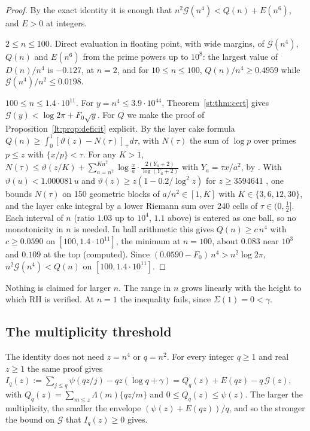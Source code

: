 \begin{proof}
By the exact identity it is enough that $n^2\mathcal G(n^4)<Q(n)+E(n^6)$, and $E>0$ at integers.

\emph{$2\le n\le100$.} Direct evaluation in floating point, with wide margins, of $\mathcal G(n^4)$, $Q(n)$ and $E(n^6)$ from the prime powers up to $10^8$: the largest value of $D(n)/n^4$ is $-0.127$, at $n=2$, and for $10\le n\le100$, $Q(n)/n^4\ge0.4959$ while $\mathcal G(n^4)/n^2\le0.0198$.

\emph{$100\le n\le1.4\cdot10^{11}$.} For $y=n^4\le3.9\cdot10^{44}$, Theorem~\ref{st:thm:cert} gives $\mathcal G(y)<\log2\pi+F_0\sqrt y$. For $Q$ we make the proof of Proposition~\ref{lt:prop:deficit} explicit. By the layer cake formula $Q(n)\ge\int_0^1[\vartheta(z)-N(\tau)]_+d\tau$, with $N(\tau)$ the sum of $\log p$ over primes $p\le z$ with $\{x/p\}<\tau$. For any $K>1$, $N(\tau)\le\vartheta(z/K)+\sum_{a=n^2}^{Kn^2}\log\frac xa\cdot\frac{2(Y_a+2)}{\log(Y_a+2)}$ with $Y_a=\tau x/a^2$, by \cite{MV73}. With $\vartheta(u)<1.000081\,u$ \cite{Schoenfeld76} and $\vartheta(z)\ge z(1-0.2/\log^2z)$ for $z\ge3594641$ \cite{Dusart10}, one bounds $N(\tau)$ on 150 geometric blocks of $a/n^2\in[1,K]$ with $K\in\{3,6,12,30\}$, and the layer cake integral by a lower Riemann sum over 240 cells of $\tau\in(0,\tfrac12]$. Each interval of $n$ (ratio $1.03$ up to $10^4$, $1.1$ above) is entered as one ball, so no monotonicity in $n$ is needed. In ball arithmetic this gives $Q(n)\ge c\,n^4$ with $c\ge0.0590$ on $[100,1.4\cdot10^{11}]$, the minimum at $n=100$, about $0.083$ near $10^3$ and $0.109$ at the top (computed).
Since $(0.0590-F_0)\,n^4>n^2\log2\pi$, $n^2\mathcal G(n^4)<Q(n)$ on $[100,1.4\cdot10^{11}]$.
\end{proof}

Nothing is claimed for larger $n$. The range in $n$ grows linearly with the height to which RH is verified. At $n=1$ the inequality fails, since $\Sigma(1)=0<\gamma$.

\subsection*{The multiplicity threshold}
The identity does not need $z=n^4$ or $q=n^2$. For every integer $q\ge1$ and real $z\ge1$ the same proof gives $I_q(z):=\sum_{j\le q}\psi(qz/j)-qz(\log q+\gamma)=Q_q(z)+E(qz)-q\,\mathcal G(z)$, with $Q_q(z)=\sum_{m\le z}\Lambda(m)\{qz/m\}$ and $0\le Q_q(z)\le\psi(z)$. The larger the multiplicity, the smaller the envelope $(\psi(z)+E(qz))/q$, and so the stronger the bound on $\mathcal G$ that $I_q(z)\ge0$ gives.

